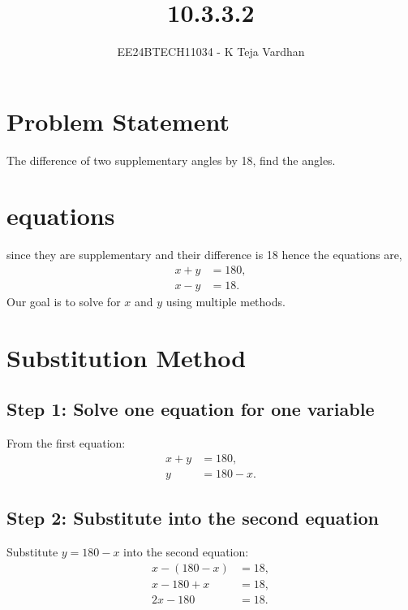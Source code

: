 \documentclass[journal]{IEEEtran}
\begin{document}

\vspace{3cm}

\title{10.3.3.2}
\author{EE24BTECH11034 - K Teja Vardhan}
{\let\newpage\relax\maketitle}

\renewcommand{\thefigure}{\theenumi}
\renewcommand{\thetable}{\theenumi}
\setlength{\intextsep}{10pt} %

\renewcommand{\thetable}{\theenumi}

\section{Problem Statement}
The difference of two supplementary angles by 18, find the angles.
\section{equations}
since they are supplementary and their difference is 18 hence the equations are,
\[
\begin{aligned}
    x + y &= 180, \\
    x - y &= 18.
\end{aligned}
\]
Our goal is to solve for \(x\) and \(y\) using multiple methods.

\section{Substitution Method}
\subsection*{Step 1: Solve one equation for one variable}
From the first equation:
\begin{align}
    x + y &= 180, \\
    y &= 180 - x.
\end{align}

\subsection*{Step 2: Substitute into the second equation}
Substitute \(y = 180 - x\) into the second equation:
\begin{align}
    x - (180 - x) &= 18, \\
    x - 180 + x &= 18, \\
    2x - 180 &= 18.
\end{align}
\end{document}
